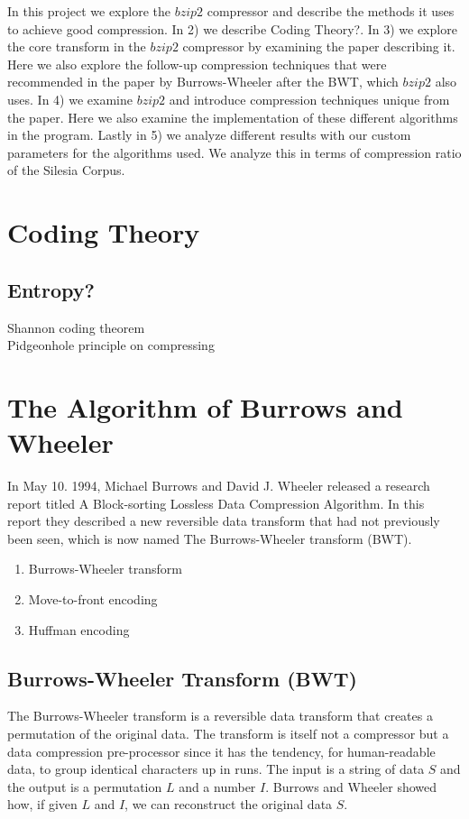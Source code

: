 \documentclass{article}
\begin{document}
In this project we explore the \(bzip2\) compressor and describe the methods it uses to achieve good compression. In 2) we describe Coding Theory?. In 3) we explore the core transform in the \(bzip2\) compressor by examining the paper describing it. Here we also explore the follow-up compression techniques that were recommended in the paper by Burrows-Wheeler after the BWT, which \(bzip2\) also uses. In 4) we examine \(bzip2\) and introduce compression techniques unique from the paper. Here we also examine the implementation of these different algorithms in the program. Lastly in 5) we analyze different results with our custom parameters for the algorithms used. We analyze this in terms of compression ratio of the Silesia Corpus\cite{silesiaCorpus}.


\section{Coding Theory}
% 
\subsection{Entropy?}
Shannon coding theorem \\
Pidgeonhole principle on compressing


\section{The Algorithm of Burrows and Wheeler}
In May 10. 1994, Michael Burrows and David J. Wheeler released a research report titled A Block-sorting Lossless Data Compression Algorithm. In this report they described a new reversible data transform that had not previously been seen, which is now named The Burrows-Wheeler transform (BWT). 
\begin{enumerate}
	\item Burrows-Wheeler transform
	\item Move-to-front encoding
	\item Huffman encoding
\end{enumerate}

\subsection{Burrows-Wheeler Transform (BWT)}
The Burrows-Wheeler transform is a reversible data transform that creates a permutation of the original data. The transform is itself not a compressor but a data compression pre-processor since it has the tendency, for human-readable data, to group identical characters up in runs.
The input is a string of data \(S\) and the output is a permutation \(L\) and a number \(I\). Burrows and Wheeler showed how, if given \(L\) and \(I\), we can reconstruct the original data \(S\). 
\end{document}
